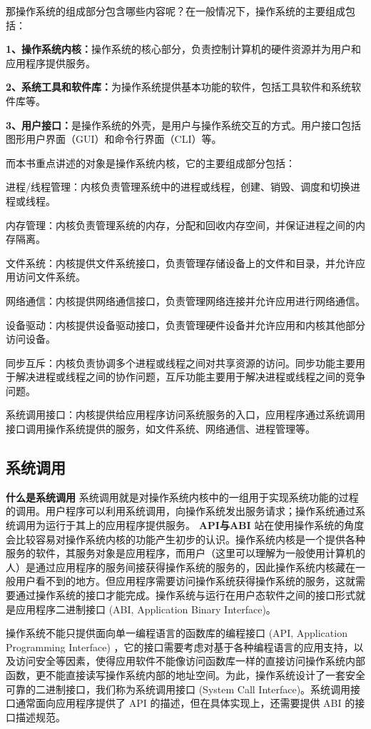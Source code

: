 那操作系统的组成部分包含哪些内容呢？在一般情况下，操作系统的主要组成包括：

\textbf{1、操作系统内核：}操作系统的核心部分，负责控制计算机的硬件资源并为用户和应用程序提供服务。

\textbf{2、系统工具和软件库：}为操作系统提供基本功能的软件，包括工具软件和系统软件库等。

\textbf{3、用户接口：}是操作系统的外壳，是用户与操作系统交互的方式。用户接口包括图形用户界面（GUI）和命令行界面（CLI）等。

而本书重点讲述的对象是操作系统内核，它的主要组成部分包括：

进程/线程管理：内核负责管理系统中的进程或线程，创建、销毁、调度和切换进程或线程。

内存管理：内核负责管理系统的内存，分配和回收内存空间，并保证进程之间的内存隔离。

文件系统：内核提供文件系统接口，负责管理存储设备上的文件和目录，并允许应用访问文件系统。

网络通信：内核提供网络通信接口，负责管理网络连接并允许应用进行网络通信。

设备驱动：内核提供设备驱动接口，负责管理硬件设备并允许应用和内核其他部分访问设备。

同步互斥：内核负责协调多个进程或线程之间对共享资源的访问。同步功能主要用于解决进程或线程之间的协作问题，互斥功能主要用于解决进程或线程之间的竞争问题。

系统调用接口：内核提供给应用程序访问系统服务的入口，应用程序通过系统调用接口调用操作系统提供的服务，如文件系统、网络通信、进程管理等。
\subsection{系统调用}
\textbf{什么是系统调用}
系统调用就是对操作系统内核中的一组用于实现系统功能的过程的调用。用户程序可以利用系统调用，向操作系统发出服务请求；操作系统通过系统调用为运行于其上的应用程序提供服务。
\textbf{API与ABI}
站在使用操作系统的角度会比较容易对操作系统内核的功能产生初步的认识。操作系统内核是一个提供各种服务的软件，其服务对象是应用程序，而用户（这里可以理解为一般使用计算机的人）是通过应用程序的服务间接获得操作系统的服务的，因此操作系统内核藏在一般用户看不到的地方。但应用程序需要访问操作系统获得操作系统的服务，这就需要通过操作系统的接口才能完成。操作系统与运行在用户态软件之间的接口形式就是应用程序二进制接口 (ABI, Application Binary Interface)。

操作系统不能只提供面向单一编程语言的函数库的编程接口 (API, Application Programming Interface) ，它的接口需要考虑对基于各种编程语言的应用支持，以及访问安全等因素，使得应用软件不能像访问函数库一样的直接访问操作系统内部函数，更不能直接读写操作系统内部的地址空间。为此，操作系统设计了一套安全可靠的二进制接口，我们称为系统调用接口 (System Call Interface)。系统调用接口通常面向应用程序提供了 API 的描述，但在具体实现上，还需要提供 ABI 的接口描述规范。


